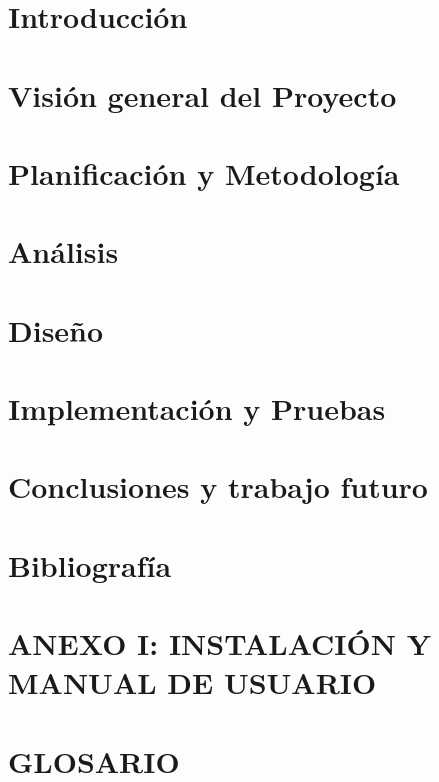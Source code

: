 \documentclass[b5paper,10pt,twoside]{book}
\begin{document}
	\tableofcontents
	
	\listoffigures
	
	\listoftables
	

	\chapter{Introducción}
	
	
	
	\chapter{Visión general del Proyecto}

	
	
	\chapter{Planificación y Metodología}
	
	
	
	\chapter{Análisis}
	
	
	
	\chapter{Diseño}
	
	
	
	\chapter{Implementación y Pruebas}
	
	
	
	\chapter{Conclusiones y trabajo futuro}
	
	
	
	\chapter{Bibliografía}
	
	
	
	\chapter*{ANEXO I: INSTALACIÓN Y MANUAL DE USUARIO }
		
	
	
	\chapter*{GLOSARIO}
	
	
\end{document}
